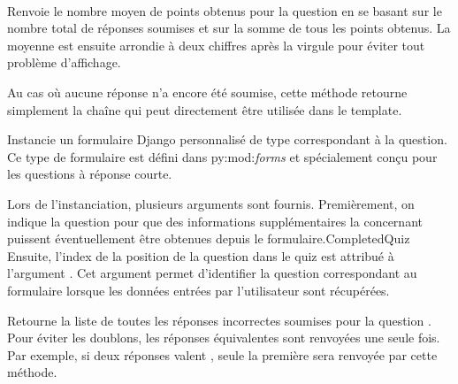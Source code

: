 \documentclass[a4,10pt,french]{sphinxmanual}
\begin{document}

\begin{fulllineitems}
\label{source:quiz.models.SimpleQuestion}~

\begin{fulllineitems}
\label{source:quiz.models.SimpleQuestion.average_result}
Renvoie le nombre moyen de points obtenus pour la question en se basant sur
le nombre total de réponses soumises et sur la somme de tous les points obtenus.
La moyenne est ensuite arrondie à deux chiffres après la virgule pour éviter
tout problème d'affichage.

Au cas où aucune réponse n'a encore été soumise, cette méthode retourne
simplement la chaîne \code{-{-}} qui peut directement être utilisée dans le template.

\end{fulllineitems}


\begin{fulllineitems}
\label{source:quiz.models.SimpleQuestion.create_form}
Instancie un formulaire Django personnalisé de type  correspondant
à la question. Ce type de formulaire est défini dans py:mod:\emph{forms} et spécialement
conçu pour les questions à réponse courte.

Lors de l'instanciation, plusieurs arguments sont fournis. Premièrement,
on indique la question  pour que des informations supplémentaires
la concernant puissent éventuellement être obtenues depuis le formulaire.CompletedQuiz
Ensuite, l'index de la position de la question dans le quiz est attribué à
l'argument . Cet argument permet d'identifier la question correspondant
au formulaire lorsque les données entrées par l'utilisateur sont récupérées.

\end{fulllineitems}


\begin{fulllineitems}
\label{source:quiz.models.SimpleQuestion.get_wrong_answers}
Retourne la liste de toutes les réponses incorrectes soumises pour la question .
Pour éviter les doublons, les réponses équivalentes sont renvoyées une seule fois.
Par exemple, si deux réponses valent , seule la première sera renvoyée par
cette méthode.


\end{fulllineitems}
\end{fulllineitems}
\end{document}
